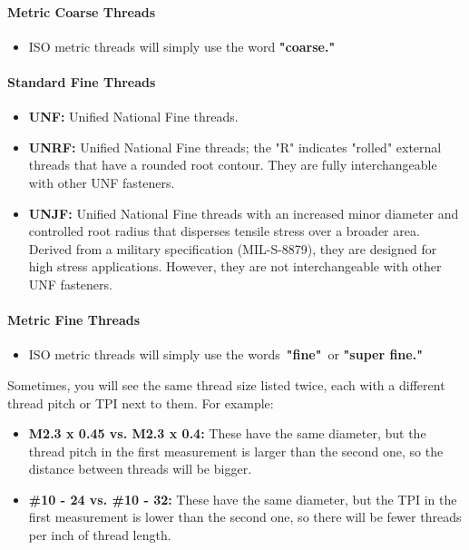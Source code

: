 \documentclass[12pt, a4paper]{article}
\providecommand{\tightlist}{%
	\setlength{\itemsep}{0pt}\setlength{\parskip}{0pt}}
\providecommand{\tightlist}{%
	\setlength{\itemsep}{0pt}\setlength{\parskip}{0pt}}
\let\oldparagraph\paragraph
\renewcommand{\paragraph}[1]{\oldparagraph{#1}\mbox{}}
\begin{document}
		\hypertarget{iyqv5s}{%
			\paragraph{Metric Coarse Threads}\label{iyqv5s}}
		
		\begin{itemize}
			\tightlist
			\item
			ISO metric threads will simply use the word \textbf{"coarse."}
		\end{itemize}
		
		\hypertarget{ixrtlg}{%
			\paragraph{Standard Fine Threads}\label{ixrtlg}}
		
		\begin{itemize}
			\tightlist
			\item
			\textbf{UNF:} Unified National Fine threads.
			\item
			\textbf{UNRF:} Unified National Fine threads; the "R" indicates
			"rolled" external threads that have a rounded root contour. They are
			fully interchangeable with other UNF fasteners.
			\item
			\textbf{UNJF:} Unified National Fine threads with an increased minor
			diameter and controlled root radius that disperses tensile stress over
			a broader area. Derived from a military specification (MIL-S-8879),
			they are designed for high stress applications. However, they are not
			interchangeable with other UNF fasteners.
		\end{itemize}
		
		\hypertarget{ipqpdr}{%
			\paragraph{Metric Fine Threads}\label{ipqpdr}}
		
		\begin{itemize}
			\tightlist
			\item
			ISO metric threads will simply use the words~\textbf{"fine"}{~or
				\textbf{"super fine."}}
		\end{itemize}
		
		\hypertarget{ie6q5l}{}
		Sometimes, you will see the same thread size listed twice, each with a
		different thread pitch or TPI next to them. For example:
		
		\begin{itemize}
			\tightlist
			\item
			\textbf{M2.3 x 0.45 vs. M2.3 x 0.4:} These have the same diameter, but
			the thread pitch in the first measurement is larger than the second
			one, so the distance between threads will be bigger.
			\item
			\textbf{\#10 - 24 vs. \#10 - 32:} These have the same diameter, but
			the TPI in the first measurement is lower than the second one, so
			there will be fewer threads per inch of thread length.
		\end{itemize}
		
\end{document}
